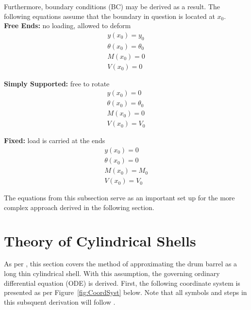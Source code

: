 Furthermore, boundary conditions (BC) may be derived as a result. The following equations assume that the boundary in question is located at $x_0$.\\

\textbf{Free Ends:} no loading, allowed to deform\\
\begin{equation}
	\label{eq:2_freeBC}
	\begin{aligned}
		y(x_0) = y_0          \\
		\theta(x_0)= \theta_0 \\
		M(x_0) = 0            \\
		V(x_0) = 0            
	\end{aligned}
\end{equation}

\textbf{Simply Supported:} free to rotate\\
\begin{equation}
	\label{eq:2_endBC}
	\begin{aligned}
		y(x_0)= 0            \\
		\theta(x_0)=\theta_0 \\
		M(x_0)= 0            \\
		V(x_0) =V_0          
	\end{aligned}
\end{equation}

\textbf{Fixed:} load is carried at the ends\\
\begin{equation}
	\label{eq:2_fixedBC}
	\begin{aligned}
		y(x_0)=0      \\
		\theta(x_0)=0 \\
		M(x_0)=M_0    \\
		V(x_0) =V_0   
	\end{aligned}
\end{equation}

The equations from this subsection serve as an important set up for the more complex approach derived in the following section. 

\section{Theory of Cylindrical Shells}
\label{section:3_shells}

As per \cite{timoshenko1959theory}, this section covers the method of approximating the drum barrel as a long thin cylindrical shell. With this assumption, the governing ordinary differential equation (ODE) is derived. First, the following coordinate system is presented as per Figure~\ref{fig:CoordSyst} below. Note that all symbols and steps in this subsquent derivation will follow \cite{timoshenko1959theory}.

